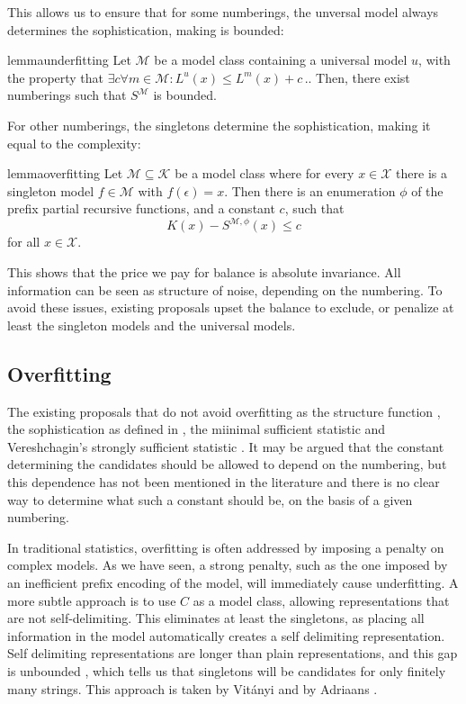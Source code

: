 \documentclass{style/llncs}
\newcommand{\M}{\mathscr M}
\newcommand{\K}{\mathscr K}
\newcommand{\X}{\mathscr X}
\newcommand{\s}{S}
\newcommand{\p}{\,\text{.}}
\begin{document}
This allows us to ensure that for some numberings, the unversal model always determines the sophistication, making is bounded:

\begin{restatable}[underfitting]{lemma}{underfitting}
Let $\M$ be a model class containing a universal model $u$, with the property that $\exists c \forall m \in \M : L^u(x) \leq L^m(x) + c \p$. Then, there exist numberings such that $\s^\M$ is bounded.
\end{restatable}
For other numberings, the singletons determine the sophistication, making it equal to the complexity:
\begin{restatable}[Overfitting]{lemma}{overfitting}
Let $\M \subseteq \K$ be a model class where for every $x\in\X$ there is a singleton model $f\in\M$ with $f(\epsilon)=x$. Then there is an enumeration $\phi$ of the prefix partial recursive functions, and a constant $c$, such that
\[
K(x)-S^{\M,\phi}(x)\le c
\]
for all $x\in\X$.
\end{restatable}
This shows that the price we pay for balance is absolute invariance. All information can be seen as structure of noise, depending on the numbering. To avoid these issues, existing proposals upset the balance to exclude, or penalize at least the singleton models and the universal models.
 
\subsection{Overfitting}

The existing proposals that do not avoid overfitting as the structure function \cite{cover1985kolmogorov}, the sophistication as defined in \cite{mota2013sophistication}, the miinimal sufficient statistic \cite{gacs2001algorithmic} and Vereshchagin's strongly  sufficient statistic \cite{vereshchagin2013algorithmic}. It may be argued that the constant determining the candidates should be allowed to depend on the numbering, but this dependence has not been mentioned in the literature and there is no clear way to determine what such a constant should be, on the basis of a given numbering. 

In traditional statistics, overfitting is often addressed by imposing a penalty on complex models. As we have seen, a strong penalty, such as the one imposed by an inefficient prefix encoding of the model, will immediately cause underfitting. A more subtle approach is to use $C$ as a model class, allowing representations that are not self-delimiting. This eliminates at least the singletons, as placing all information in the model automatically creates a self delimiting representation. Self delimiting representations are longer than plain representations, and this gap is unbounded \cite[Section~4.5.5]{vitanyi2004meaningful}, which tells us that singletons will be candidates for only finitely many strings. This approach is taken by Vit\'anyi \cite{vitanyi2004meaningful} and by Adriaans \cite{adriaans2012facticity}. 
\end{document}
